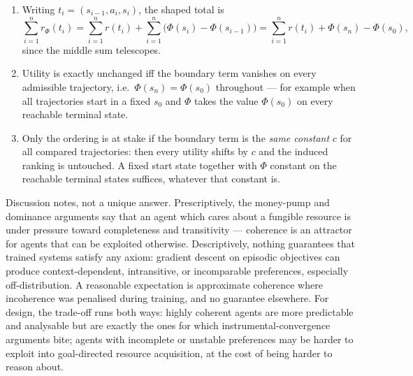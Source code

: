 \documentclass[11pt]{article}
\begin{document}
\begin{solution}
\begin{enumerate}[label=(\alph*)]
\item Writing $t_i=(s_{i-1},a_i,s_i)$, the shaped total is
\[
\sum_{i=1}^{n} r_\Phi(t_i)
=\sum_{i=1}^{n} r(t_i)+\sum_{i=1}^{n}\bigl(\Phi(s_i)-\Phi(s_{i-1})\bigr)
=\sum_{i=1}^{n} r(t_i)+\Phi(s_n)-\Phi(s_0),
\]
since the middle sum telescopes.
\item Utility is exactly unchanged iff the boundary term vanishes on every
admissible trajectory, i.e.\ $\Phi(s_n)=\Phi(s_0)$ throughout — for example
when all trajectories start in a fixed $s_0$ and $\Phi$ takes the value
$\Phi(s_0)$ on every reachable terminal state.
\item Only the ordering is at stake if the boundary term is the \emph{same
constant} $c$ for all compared trajectories: then every utility shifts by
$c$ and the induced ranking is untouched. A fixed start state together with
$\Phi$ constant on the reachable terminal states suffices, whatever that
constant is.
\end{enumerate}
\end{solution}

\begin{solution}
Discussion notes, not a unique answer. Prescriptively, the money-pump and
dominance arguments say that an agent which cares about a fungible resource
is under pressure toward completeness and transitivity — coherence is an
attractor for agents that can be exploited otherwise. Descriptively, nothing
guarantees that trained systems satisfy any axiom: gradient descent on
episodic objectives can produce context-dependent, intransitive, or
incomparable preferences, especially off-distribution. A reasonable
expectation is approximate coherence where incoherence was penalised during
training, and no guarantee elsewhere. For design, the trade-off runs both
ways: highly coherent agents are more predictable and analysable but are
exactly the ones for which instrumental-convergence arguments bite; agents
with incomplete or unstable preferences may be harder to exploit into
goal-directed resource acquisition, at the cost of being harder to reason
about.
\end{solution}
\end{document}
